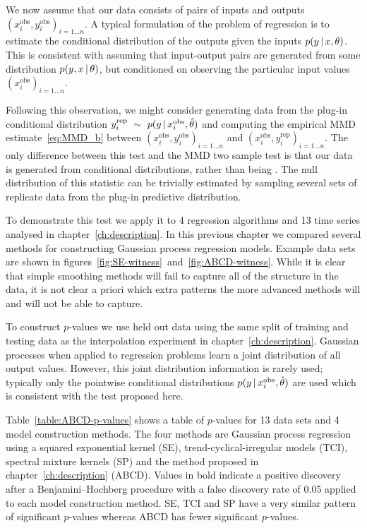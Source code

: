 We now assume that our data consists of pairs of inputs and outputs ${(x_i^\textrm{obs}, y_i^\textrm{obs})_{i=1\ldots n}}$.
A typical formulation of the problem of regression is to estimate the conditional distribution of the outputs given the inputs ${p(y\,|\, x, \theta)}$.
This is consistent with assuming that input-output pairs are generated \iid from some distribution ${p(y, x \,|\, \theta)}$, but conditioned on observing the particular input values ${(x_i^\textrm{obs})_{i=1\ldots n}}$.

Following this observation, we might consider generating data from the plug-in conditional distribution ${y_i^\textrm{rep} \ \sim\  p(y\,|\, x_i^\textrm{obs}, \hat\theta)}$ and computing the empirical MMD estimate~\eqref{eq:MMD_b} between ${(x_i^\textrm{obs}, y_i^\textrm{obs})_{i=1\ldots n}}$ and ${(x_i^\textrm{obs}, y_i^\textrm{rep})_{i=1\ldots n}}$.
The only difference between this test and the MMD two sample test is that our data is generated from conditional distributions, rather than being \iid.
The null distribution of this statistic can be trivially estimated by sampling several sets of replicate data from the plug-in predictive distribution.

To demonstrate this test we apply it to 4 regression algorithms and 13 time series analysed in chapter~\ref{ch:description}.
In this previous chapter we compared several methods for constructing Gaussian process regression models.
Example data sets are shown in figures~\ref{fig:SE-witness}~and~\ref{fig:ABCD-witness}.
While it is clear that simple smoothing methods will fail to capture all of the structure in the data, it is not clear a priori which extra patterns the more advanced methods will and will not be able to capture.

To construct $p$-values we use held out data using the same split of training and testing data as the interpolation experiment in chapter~\ref{ch:description}.
Gaussian processes when applied to regression problems learn a joint distribution of all output values.
However, this joint distribution information is rarely used; typically only the pointwise conditional distributions ${p(y\,|\, x_i^\textrm{obs}, \hat\theta)}$ are used which is consistent with the test proposed here.

Table~\ref{table:ABCD-p-values} shows a table of $p$-values for 13 data sets and 4 model construction methods.
The four methods are Gaussian process regression using a squared exponential kernel (SE), trend-cyclical-irregular models \citep[e.g.][]{Lind2006-th} (TCI), spectral mixture kernels \citep{Wilson2013-eq} (SP) and the method proposed in chapter~\ref{ch:description} (ABCD).
Values in  bold indicate a positive discovery after a Benjamini--Hochberg \citep{Benjamini_undated-mh} procedure with a false discovery rate of 0.05 applied to each model construction method.
SE, TCI and SP have a very similar pattern of significant $p$-values whereas ABCD has fewer significant $p$-values.

